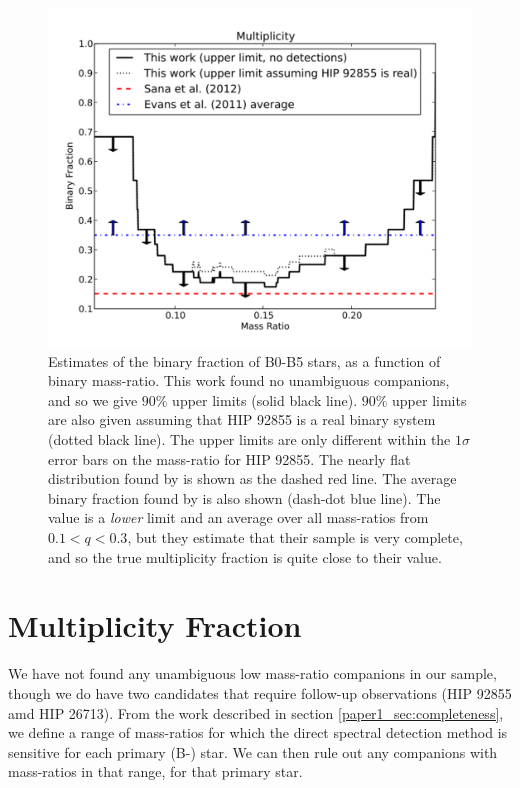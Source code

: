 \begin{figure}[ht]
  \centering
  \includegraphics[width=\columnwidth]{Figures/paper1_fig7.pdf}
  \caption{Estimates of the binary fraction of B0-B5 stars,
    as a function of binary mass-ratio. This work found no unambiguous companions,
    and so we give $90\%$ upper limits (solid black line). $90\%$
    upper limits are also given assuming that HIP 92855 is a real
    binary system (dotted black line). The upper limits are only different within the
    $1\sigma$ error bars on the mass-ratio for HIP 92855. The nearly flat 
    distribution found by \cite{Sana2012} is shown as the dashed red line. The average binary 
    fraction found by \cite{Evans2011} is also shown (dash-dot blue line). The
    \cite{Evans2011} value is a \emph{lower} limit and an average over all mass-ratios from $0.1 < q < 0.3$, but they estimate
    that their sample is very complete, and so the true multiplicity fraction is quite close to their value.}
  \label{paper1_fig:limits}
\end{figure}


\section{Multiplicity Fraction}
\label{paper1_sec:multiplicity}

We have not found any unambiguous low mass-ratio companions in our
sample, though we do have two candidates that require follow-up
observations (HIP 92855 amd HIP 26713). From the work described in section
\ref{paper1_sec:completeness}, we define a range
of mass-ratios for which the direct spectral detection method is
sensitive for each primary (B-) star. We can then rule out any
companions with mass-ratios in that range, for that primary star.

